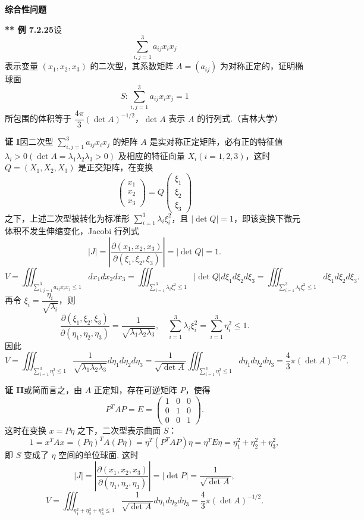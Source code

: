 \documentclass[UTF8,12pt,a4paper,fontset=fandol]{ctexart}
\begin{document}
\noindent\textbf{综合性问题}

\noindent\textbf{** 例 7.2.25}\quad 设
\[
\sum_{i,j=1}^3a_{ij}x_ix_j
\]
表示变量 $(x_1,x_2,x_3)$ 的二次型，其系数矩阵 $A=(a_{ij})$ 为对称正定的，证明椭球面
\[
S:\sum_{i,j=1}^3a_{ij}x_ix_j=1
\]
所包围的体积等于 $\dfrac{4\pi}3(\det A)^{-1/2}$，$\det A$ 表示 $A$ 的行列式.（吉林大学）

\noindent\textbf{证 I}\quad 因二次型 $\sum_{i,j=1}^3a_{ij}x_ix_j$ 的矩阵 $A$ 是实对称正定矩阵，必有正的特征值 $\lambda_i>0(\det A=\lambda_1\lambda_2\lambda_3>0)$ 及相应的特征向量 $X_i(i=1,2,3)$，这时 $Q=(X_1,X_2,X_3)$ 是正交矩阵，在变换
\[
\begin{pmatrix}x_1\\x_2\\x_3\end{pmatrix}
=Q\begin{pmatrix}\xi_1\\\xi_2\\\xi_3\end{pmatrix}
\]
之下，上述二次型被转化为标准形 $\sum_{i=1}^3\lambda_i\xi_i^2$，且 $|\det Q|=1$，即该变换下微元体积不发生伸缩变化，Jacobi 行列式
\[
|J|=\left|\frac{\partial(x_1,x_2,x_3)}{\partial(\xi_1,\xi_2,\xi_3)}\right|
=|\det Q|=1.
\]
\[
V=\iiint_{\sum_{i,j=1}^3a_{ij}x_ix_j\le1}dx_1dx_2dx_3
=\iiint_{\sum_{i=1}^3\lambda_i\xi_i^2\le1}|\det Q|d\xi_1d\xi_2d\xi_3
=\iiint_{\sum_{i=1}^3\lambda_i\xi_i^2\le1}d\xi_1d\xi_2d\xi_3.
\]
再令 $\xi_i=\dfrac{\eta_i}{\sqrt{\lambda_i}}$，则
\[
\frac{\partial(\xi_1,\xi_2,\xi_3)}{\partial(\eta_1,\eta_2,\eta_3)}
=\frac1{\sqrt{\lambda_1\lambda_2\lambda_3}},
\quad
\sum_{i=1}^3\lambda_i\xi_i^2=\sum_{i=1}^3\eta_i^2\le1.
\]
因此
\[
V=\iiint_{\sum_{i=1}^3\eta_i^2\le1}
\frac1{\sqrt{\lambda_1\lambda_2\lambda_3}}d\eta_1d\eta_2d\eta_3
=\frac1{\sqrt{\det A}}\iiint_{\sum_{i=1}^3\eta_i^2\le1}d\eta_1d\eta_2d\eta_3
=\frac43\pi(\det A)^{-1/2}.
\]

\noindent\textbf{证 II}\quad 或简而言之，由 $A$ 正定知，存在可逆矩阵 $P$，使得
\[
P^TAP=E=\begin{pmatrix}
1&0&0\\
0&1&0\\
0&0&1
\end{pmatrix}.
\]
这时在变换 $x=P\eta$ 之下，二次型表示曲面 $S$：
\[
1=x^TAx=(P\eta)^TA(P\eta)=\eta^T(P^TAP)\eta=\eta^TE\eta
=\eta_1^2+\eta_2^2+\eta_3^2,
\]
即 $S$ 变成了 $\eta$ 空间的单位球面. 这时
\[
|J|=\left|\frac{\partial(x_1,x_2,x_3)}{\partial(\eta_1,\eta_2,\eta_3)}\right|
=|\det P|=\frac1{\sqrt{\det A}},
\]
\[
V=\iiint_{\eta_1^2+\eta_2^2+\eta_3^2\le1}
\frac1{\sqrt{\det A}}d\eta_1d\eta_2d\eta_3
=\frac43\pi(\det A)^{-1/2}.
\]
\end{document}
